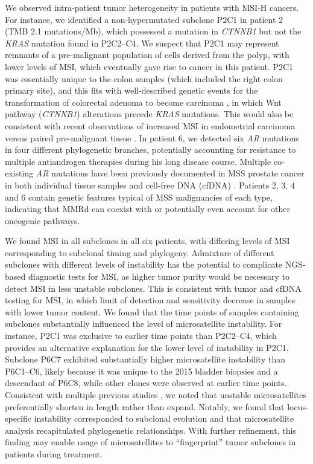 We observed intra-patient tumor heterogeneity in patients with MSI-H cancers. For instance, we identified a non-hypermutated subclone P2C1 in patient 2 (TMB 2.1 mutations/Mb), which possessed a mutation in \textit{CTNNB1} but not the \textit{KRAS} mutation found in P2C2--C4. We suspect that P2C1 may represent remnants of a pre-malignant population of cells derived from the polyp, with lower levels of MSI, which eventually gave rise to cancer in this patient. P2C1 was essentially unique to the colon samples (which included the right colon primary site), and this fits with well-described genetic events for the transformation of colorectal adenoma to become carcinoma \cite{armaghany2012}, in which Wnt pathway (\textit{CTNNB1}) alterations precede \textit{KRAS} mutations. This would also be consistent with recent observations of increased MSI in endometrial carcinoma versus paired pre-malignant tissue \cite{chapel2019}. In patient 6, we detected six \textit{AR} mutations in four different phylogenetic branches, potentially accounting for resistance to multiple antiandrogen therapies during his long disease course. Multiple co-existing \textit{AR} mutations have been previously documented in MSS prostate cancer in both individual tissue samples \cite{robinson2015} and cell-free DNA (cfDNA) \cite{lallous2016,sumiyoshi2019,torquato2019}. Patients 2, 3, 4 and 6 contain genetic features typical of MSS malignancies of each type, indicating that MMRd can coexist with or potentially even account for other oncogenic pathways.

We found MSI in all subclones in all six patients, with differing levels of MSI corresponding to subclonal timing and phylogeny. Admixture of different subclones with different levels of instability has the potential to complicate NGS-based diagnostic tests for MSI, as higher tumor purity would be necessary to detect MSI in less unstable subclones. This is consistent with tumor and cfDNA testing for MSI, in which limit of detection and sensitivity decrease in samples with lower tumor content. We found that the time points of samples containing subclones substantially influenced the level of microsatellite instability. For instance, P2C1 was exclusive to earlier time points than P2C2--C4, which provides an alternative explanation for the lower level of instability in P2C1. Subclone P6C7 exhibited substantially higher microsatellite instability than P6C1--C6, likely because it was unique to the 2015 bladder biopsies and a descendant of P6C8, while other clones were observed at earlier time points. Consistent with multiple previous studies \cite{kim2013,currey2018}, we noted that unstable microsatellites preferentially shorten in length rather than expand. Notably, we found that locus-specific instability corresponded to subclonal evolution and that microsatellite analysis recapitulated phylogenetic relationships. With further refinement, this finding may enable usage of microsatellites to ``fingerprint'' tumor subclones in patients during treatment.

